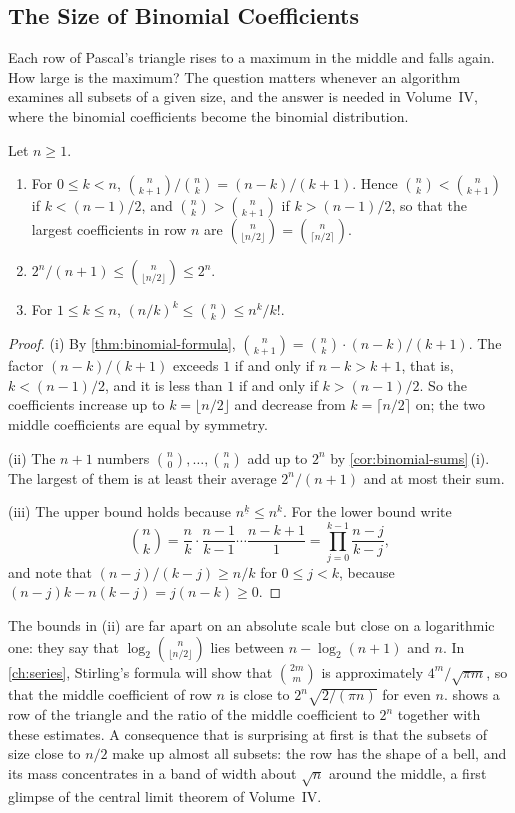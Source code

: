 \subsection{The Size of Binomial Coefficients}

Each row of Pascal's triangle rises to a maximum in the middle and falls again. How large is the maximum? The question matters whenever an algorithm examines all subsets of a given size, and the answer is needed in Volume~IV, where the binomial coefficients become the binomial distribution.

\begin{proposition}
\label{prop:binomial-size}
Let $n\ge1$.
\begin{enumerate}
\item For $0\le k<n$, $\binom n{k+1}\big/\binom nk=(n-k)/(k+1)$. Hence $\binom nk<\binom n{k+1}$ if $k<(n-1)/2$, and $\binom nk>\binom n{k+1}$ if $k>(n-1)/2$, so that the largest coefficients in row $n$ are $\binom n{\lfloor n/2\rfloor}=\binom n{\lceil n/2\rceil}$.
\item $2^n/(n+1)\le\binom n{\lfloor n/2\rfloor}\le2^n$.
\item For $1\le k\le n$, $(n/k)^k\le\binom nk\le n^k/k!$.
\end{enumerate}
\end{proposition}

\begin{proof}
(i) By \cref{thm:binomial-formula}, $\binom n{k+1}=\binom nk\cdot(n-k)/(k+1)$. The factor $(n-k)/(k+1)$ exceeds $1$ if and only if $n-k>k+1$, that is, $k<(n-1)/2$, and it is less than $1$ if and only if $k>(n-1)/2$. So the coefficients increase up to $k=\lfloor n/2\rfloor$ and decrease from $k=\lceil n/2\rceil$ on; the two middle coefficients are equal by symmetry.

(ii) The $n+1$ numbers $\binom n0,\ldots,\binom nn$ add up to $2^n$ by \cref{cor:binomial-sums}\,(i). The largest of them is at least their average $2^n/(n+1)$ and at most their sum.

(iii) The upper bound holds because $n^{\underline k}\le n^k$. For the lower bound write
\[
\binom nk=\frac{n}{k}\cdot\frac{n-1}{k-1}\cdots\frac{n-k+1}{1}=\prod_{j=0}^{k-1}\frac{n-j}{k-j},
\]
and note that $(n-j)/(k-j)\ge n/k$ for $0\le j<k$, because $(n-j)k-n(k-j)=j(n-k)\ge0$.
\end{proof}

The bounds in (ii) are far apart on an absolute scale but close on a logarithmic one: they say that $\log_2\binom n{\lfloor n/2\rfloor}$ lies between $n-\log_2(n+1)$ and $n$. In \cref{ch:series}, Stirling's formula will show that $\binom{2m}{m}$ is approximately $4^m/\sqrt{\pi m}$, so that the middle coefficient of row $n$ is close to $2^n\sqrt{2/(\pi n)}$ for even $n$.  shows a row of the triangle and the ratio of the middle coefficient to $2^n$ together with these estimates. A consequence that is surprising at first is that the subsets of size close to $n/2$ make up almost all subsets: the row has the shape of a bell, and its mass concentrates in a band of width about $\sqrt n$ around the middle, a first glimpse of the central limit theorem of Volume~IV.

